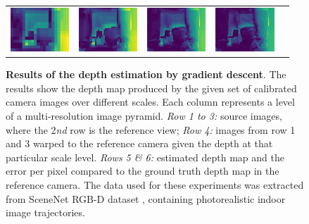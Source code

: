 \begin{figure}
\begin{center}
\begin{tabular}{c c c c c}
        \includegraphics[width=2.2cm]{main/chapter03/data/depth/error_2.jpg} &
        \includegraphics[width=2.2cm]{main/chapter03/data/depth/error_3.jpg} &
        \includegraphics[width=2.2cm]{main/chapter03/data/depth/error_4.jpg} &
        \includegraphics[width=2.2cm]{main/chapter03/data/depth/error_5.jpg} 
        \end{tabular}
    \end{center}
    \caption{{\bf Results of the depth estimation by gradient descent}. The results show the depth map produced by the given set of calibrated camera images over different scales. Each column represents a level of a multi-resolution image pyramid. \textit{Row 1 to 3:} source images, where the 2\textit{nd} row is the reference view; \textit{Row 4:} images from row 1 and 3 warped to the reference camera given the depth at that particular scale level. \textit{Rows 5 \& 6:} estimated depth map and the error per pixel compared to the ground truth depth map in the reference camera. The data used for these experiments was extracted from SceneNet RGB-D dataset \citep{McCormac:etal:ICCV2017}, containing photorealistic indoor image trajectories.}
    \label{fig:multiview:depth_estimation}
\end{figure}
%

